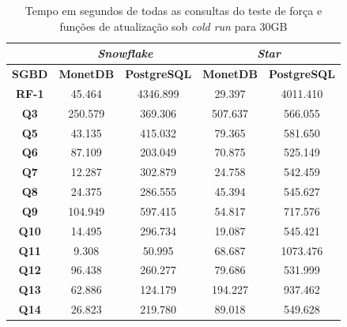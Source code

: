 \begin{table}[t]
        \centering
        \caption{Tempo em segundos de todas as consultas do teste de força e funções de atualização sob \textit{cold run} para 30GB}
        \label{tab:queries_cold_30}
        \begin{tabular}{|c|c|c|c|c|}
        \hline
                & \multicolumn{2}{c|}{\textit{\textbf{Snowflake}}} & \multicolumn{2}{c|}{\textit{\textbf{Star}}} \\ \hline
        \textbf{SGBD}  & \textbf{MonetDB}      & \textbf{PostgreSQL}      & \textbf{MonetDB}    & \textbf{PostgreSQL}   \\ \hline
        \textbf{RF-1}  & 45.464                & 4346.899                 & 29.397              & 4011.410              \\ \hline
        \textbf{Q3}    & 250.579               & 369.306                  & 507.637             & 566.055               \\ \hline
        \textbf{Q5}    & 43.135                & 415.032                  & 79.365              & 581.650               \\ \hline
        \textbf{Q6}    & 87.109                & 203.049                  & 70.875              & 525.149               \\ \hline
        \textbf{Q7}    & 12.287                & 302.879                  & 24.758              & 542.459               \\ \hline
        \textbf{Q8}    & 24.375                & 286.555                  & 45.394              & 545.627               \\ \hline
        \textbf{Q9}    & 104.949               & 597.415                  & 54.817              & 717.576               \\ \hline
        \textbf{Q10}   & 14.495                & 296.734                  & 19.087              & 545.421               \\ \hline
        \textbf{Q11}   & 9.308                 & 50.995                   & 68.687              & 1073.476              \\ \hline
        \textbf{Q12}   & 96.438                & 260.277                  & 79.686              & 531.999               \\ \hline
        \textbf{Q13}   & 62.886                & 124.179                  & 194.227             & 937.462               \\ \hline
        \textbf{Q14}   & 26.823                & 219.780                  & 89.018              & 549.628               \\ \hline

\end{tabular}
\end{table}
